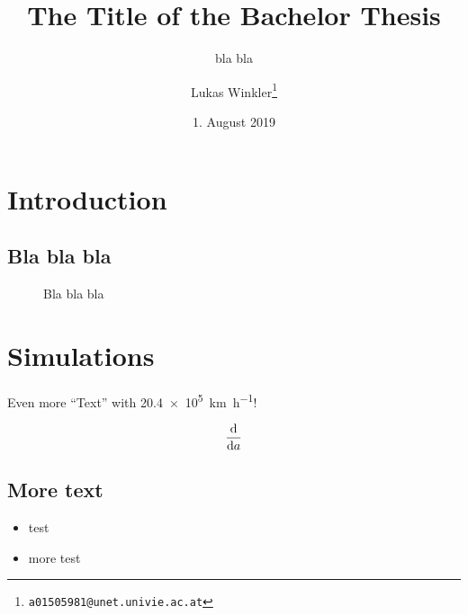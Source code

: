 
\title{The Title of the Bachelor Thesis}
\subtitle{bla bla}
\author{Lukas Winkler\footnote{\texttt{a01505981@unet.univie.ac.at}}}
\date{1. August 2019}

\usepackage{lipsum}  %
\newcommand{\blabla}{Bla bla bla}


	
\maketitle

\tableofcontents

\chapter{Introduction}\label{introduction}

\lipsum[1]

\section{\blabla}

\lipsum[1-2]


\begin{figure}
	\centering
	\caption{\blabla}
	\label{fig:bla}
\end{figure}

\chapter{Simulations}

\lipsum[1-2]

Even more \enquote{Text} with \SI{20.4e5}{\kilo\meter\per\hour}!

\begin{align}
	\dv{a}
\end{align}

\section{More text}

\lipsum[2-5]



\begin{itemize}
\setlength\itemsep{-0.5em}
\item test
\item more test
\end{itemize}

